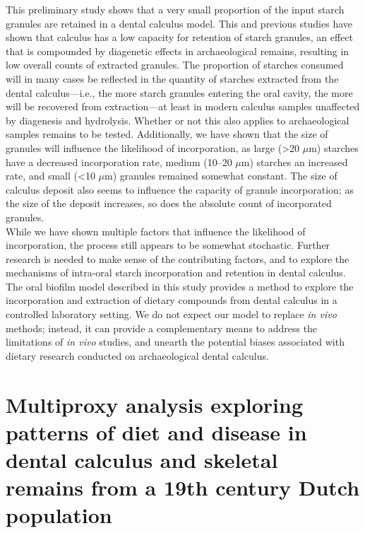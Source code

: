 \documentclass[
  letterpaper,
]{book}
\begin{document}
This preliminary study shows that a very small proportion of the input
starch granules are retained in a dental calculus model. This and
previous studies have shown that calculus has a low capacity for
retention of starch granules, an effect that is compounded by diagenetic
effects in archaeological remains, resulting in low overall counts of
extracted granules. The proportion of starches consumed will in many
cases be reflected in the quantity of starches extracted from the dental
calculus---i.e., the more starch granules entering the oral cavity, the
more will be recovered from extraction---at least in modern calculus
samples unaffected by diagenesis and hydrolysis. Whether or not this
also applies to archaeological samples remains to be tested.
Additionally, we have shown that the size of granules will influence the
likelihood of incorporation, as large (\textgreater20 \(\mu\)m) starches
have a decreased incorporation rate, medium (10--20 \(\mu\)m) starches
an increased rate, and small (\textless10 \(\mu\)m) granules remained
somewhat constant. The size of calculus deposit also seems to influence
the capacity of granule incorporation; as the size of the deposit
increases, so does the absolute count of incorporated granules.\\
While we have shown multiple factors that influence the likelihood of
incorporation, the process still appears to be somewhat stochastic.
Further research is needed to make sense of the contributing factors,
and to explore the mechanisms of intra-oral starch incorporation and
retention in dental calculus. The oral biofilm model described in this
study provides a method to explore the incorporation and extraction of
dietary compounds from dental calculus in a controlled laboratory
setting. We do not expect our model to replace \emph{in vivo} methods;
instead, it can provide a complementary means to address the limitations
of \emph{in vivo} studies, and unearth the potential biases associated
with dietary research conducted on archaeological dental calculus.


\hypertarget{multiproxy-analysis-exploring-patterns-of-diet-and-disease-in-dental-calculus-and-skeletal-remains-from-a-19th-century-dutch-population}{%
\chapter{Multiproxy analysis exploring patterns of diet and disease in
dental calculus and skeletal remains from a 19th century Dutch
population}\label{multiproxy-analysis-exploring-patterns-of-diet-and-disease-in-dental-calculus-and-skeletal-remains-from-a-19th-century-dutch-population}}
\end{document}
